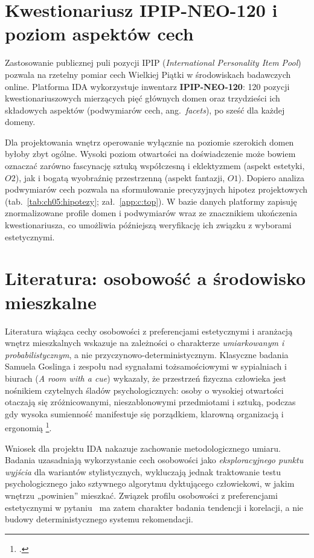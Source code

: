 \section{Kwestionariusz IPIP-NEO-120 i poziom aspektów cech}
\label{ch05:sec:ipip}

Zastosowanie publicznej puli pozycji IPIP (\emph{International Personality Item Pool}) pozwala na rzetelny pomiar cech Wielkiej Piątki w środowiskach badawczych online.
Platforma IDA wykorzystuje inwentarz \textbf{IPIP-NEO-120}: 120 pozycji kwestionariuszowych mierzących pięć głównych domen oraz trzydzieści ich składowych aspektów (podwymiarów cech, ang.\ \emph{facets}), po sześć dla każdej domeny.

Dla projektowania wnętrz operowanie wyłącznie na poziomie szerokich domen byłoby zbyt ogólne. Wysoki poziom otwartości na doświadczenie może bowiem oznaczać zarówno fascynację sztuką współczesną i eklektyzmem (aspekt estetyki, $O2$), jak i bogatą wyobraźnię przestrzenną (aspekt fantazji, $O1$). Dopiero analiza podwymiarów cech pozwala na sformułowanie precyzyjnych hipotez projektowych (tab.~\ref{tab:ch05:hipotezy}; zał.~\ref{app:c:top}).
W bazie danych platformy zapisuję znormalizowane profile domen i podwymiarów wraz ze znacznikiem ukończenia kwestionariusza, co umożliwia późniejszą weryfikację ich związku z wyborami estetycznymi.

\section{Literatura: osobowość a środowisko mieszkalne}
\label{ch05:sec:literatura}

Literatura wiążąca cechy osobowości z preferencjami estetycznymi i aranżacją wnętrz mieszkalnych wskazuje na zależności o charakterze \emph{umiarkowanym i probabilistycznym}, a nie przyczynowo-deterministycznym.
Klasyczne badania Samuela Goslinga i zespołu nad sygnałami tożsamościowymi w sypialniach i biurach (\emph{A room with a cue}) wykazały, że przestrzeń fizyczna człowieka jest nośnikiem czytelnych śladów psychologicznych: osoby o wysokiej otwartości otaczają się zróżnicowanymi, nieszablonowymi przedmiotami i sztuką, podczas gdy wysoka sumienność manifestuje się porządkiem, klarowną organizacją i ergonomią \footcite{gosling2002room}.

Wniosek dla projektu IDA nakazuje zachowanie metodologicznego umiaru. Badania uzasadniają wykorzystanie cech osobowości jako \emph{eksploracyjnego punktu wyjścia} dla wariantów stylistycznych, wykluczają jednak traktowanie testu psychologicznego jako sztywnego algorytmu dyktującego człowiekowi, w jakim wnętrzu „powinien” mieszkać.
Związek profilu osobowości z preferencjami estetycznymi w pytaniu~ ma zatem charakter badania tendencji i korelacji, a nie budowy deterministycznego systemu rekomendacji.


